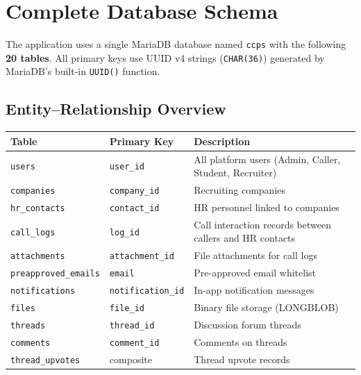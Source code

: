 \documentclass[12pt,a4paper]{article}
\begin{document}
\section{Complete Database Schema}

The application uses a single MariaDB database named \texttt{ccps} with the following \textbf{20 tables}. All primary keys use UUID v4 strings (\texttt{CHAR(36)}) generated by MariaDB's built-in \texttt{UUID()} function.

\subsection{Entity--Relationship Overview}

\begin{center}
\small
\begin{tabular}{llp{7cm}}
    \toprule
    \textbf{Table} & \textbf{Primary Key} & \textbf{Description} \\
    \midrule
    \texttt{users}                & \texttt{user\_id}        & All platform users (Admin, Caller, Student, Recruiter) \\
    \texttt{companies}            & \texttt{company\_id}     & Recruiting companies \\
    \texttt{hr\_contacts}         & \texttt{contact\_id}     & HR personnel linked to companies \\
    \texttt{call\_logs}           & \texttt{log\_id}         & Call interaction records between callers and HR contacts \\
    \texttt{attachments}          & \texttt{attachment\_id}  & File attachments for call logs \\
    \texttt{preapproved\_emails}  & \texttt{email}           & Pre-approved email whitelist \\
    \texttt{notifications}        & \texttt{notification\_id}& In-app notification messages \\
    \texttt{files}                & \texttt{file\_id}        & Binary file storage (LONGBLOB) \\
    \texttt{threads}              & \texttt{thread\_id}      & Discussion forum threads \\
    \texttt{comments}             & \texttt{comment\_id}     & Comments on threads \\
    \texttt{thread\_upvotes}      & composite               & Thread upvote records \\

\end{tabular}
\end{center}
\end{document}

